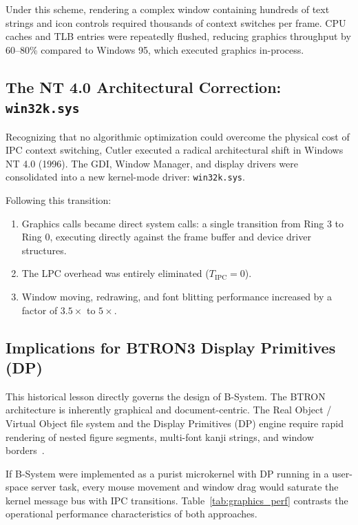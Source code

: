 \documentclass[10pt,journal,compsoc,twocolumn]{article}
\begin{document}
Under this scheme, rendering a complex window containing hundreds of text strings and icon controls required thousands of context switches per frame. CPU caches and TLB entries were repeatedly flushed, reducing graphics throughput by 60--80\% compared to Windows 95, which executed graphics in-process.

\subsection{The NT 4.0 Architectural Correction: \texttt{win32k.sys}}
Recognizing that no algorithmic optimization could overcome the physical cost of IPC context switching, Cutler executed a radical architectural shift in Windows NT 4.0 (1996). The GDI, Window Manager, and display drivers were consolidated into a new kernel-mode driver: \texttt{win32k.sys}.

Following this transition:
\begin{enumerate}[leftmargin=*]
    \item Graphics calls became direct system calls: a single transition from Ring 3 to Ring 0, executing directly against the frame buffer and device driver structures.
    \item The LPC overhead was entirely eliminated ($T_{\text{IPC}} = 0$).
    \item Window moving, redrawing, and font blitting performance increased by a factor of $3.5\times$ to $5\times$.
\end{enumerate}

\subsection{Implications for BTRON3 Display Primitives (DP)}
This historical lesson directly governs the design of B-System. The BTRON architecture is inherently graphical and document-centric. The Real Object / Virtual Object file system and the Display Primitives (DP) engine require rapid rendering of nested figure segments, multi-font kanji strings, and window borders~\cite{btron3spec}.

If B-System were implemented as a purist microkernel with DP running in a user-space server task, every mouse movement and window drag would saturate the kernel message bus with IPC transitions. Table~\ref{tab:graphics_perf} contrasts the operational performance characteristics of both approaches.
\end{document}
